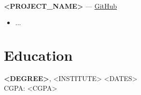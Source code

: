 \documentclass[11pt]{article}
\begin{document}
\textbf{<PROJECT_NAME>} — \href{<GITHUB_LINK>}{GitHub} \\
\begin{itemize}
    \item ...
\end{itemize}

\section*{Education}
\textbf{<DEGREE>}, <INSTITUTE> \hfill <DATES> \\
CGPA: <CGPA>
\end{document}
